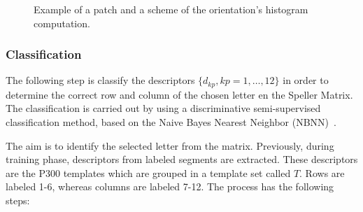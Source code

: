 \documentclass[entropy,article,submit,moreauthors,pdftex,10pt,a4paper]{mdpi}
\begin{document}
 
\begin{figure}[H]
\centering
{}
\caption{ Example of a patch and a scheme of the orientation's histogram computation.}
\label{fig:sampledescriptor}
\end{figure}

\subsubsection{Classification}
\label{Classification}

The following step is classify the descriptors $\{d_{kp}, kp =1,\dots, 12\}$ in order to determine the correct row and column of the chosen letter en the Speller Matrix.   The classification is carried out by using a discriminative semi-supervised classification method, based on the Naive Bayes Nearest Neighbor (NBNN)~\citep{Boiman2008}.

The aim is to identify the selected letter from the matrix. Previously, during training phase, descriptors from labeled segments are extracted.  These descriptors are the P300 templates which are grouped in a template set called $ T $.  Rows are labeled 1-6, whereas columns are labeled 7-12.  The process has the following steps:
\end{document}
